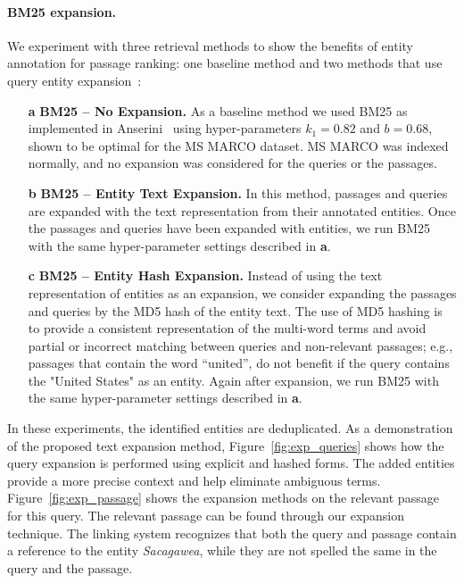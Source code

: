 \paragraph{BM25 expansion.} We experiment with three retrieval methods to show the benefits of entity annotation for passage ranking: one baseline method and two methods that use query entity expansion~\citep{Shehata}:
\begin{itemize}
\item[\textbf{a}] \textbf{BM25 -- No Expansion.} As a baseline method we used BM25 as implemented in Anserini~\cite{Kamphuis2020BM25} using hyper-parameters $k_1=0.82$ and $b=0.68$, shown to be optimal for the MS MARCO dataset. MS MARCO was indexed normally, and no expansion was considered for the queries or the passages. 
\item[\textbf{b}] \textbf{BM25 -- Entity Text Expansion.} In this method, passages and queries are expanded with the text representation from their annotated entities. Once the passages and queries have been expanded with entities, we run BM25 with the same hyper-parameter settings described in \textbf{a}.
\item[\textbf{c}] \textbf{BM25 -- Entity Hash Expansion.} Instead of using the text representation of entities as an expansion, we consider expanding the passages and queries by the MD5 hash of the entity text. The use of MD5 hashing is to provide a consistent representation of the multi-word terms and avoid partial or incorrect matching between queries and non-relevant passages; e.g., passages that contain the word ``united'', do not benefit if the query contains the "United States" as an entity. Again after expansion, we run BM25 with the same hyper-parameter settings described in \textbf{a}.
\end{itemize}
In these experiments, the identified entities are deduplicated. As a demonstration of the proposed text expansion method, Figure~\ref{fig:exp_queries} shows how the query expansion is performed using explicit and hashed forms. The added entities provide a more precise context and help eliminate ambiguous terms. Figure~\ref{fig:exp_passage} shows the expansion methods on the relevant passage for this query. The relevant passage can be found through our expansion technique. The linking system recognizes that both the query and passage contain a reference to the entity \emph{Sacagawea}, while they are not spelled the same in the query and the passage.



